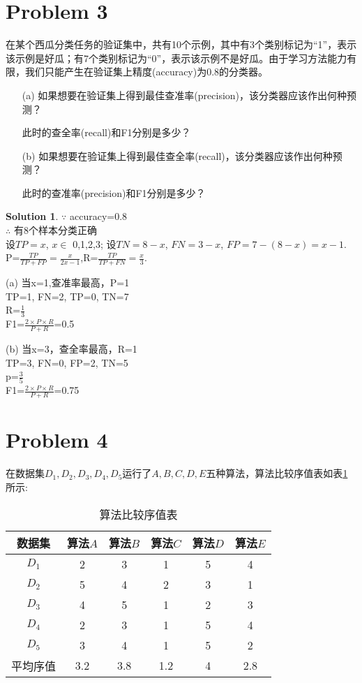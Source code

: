 \documentclass[a4paper,UTF8]{article}
\theoremstyle{definition}
\newtheorem*{solution}{Solution}
\begin{document}
\section*{Problem 3} 
在某个西瓜分类任务的验证集中，共有10个示例，其中有3个类别标记为“1”，表示该示例是好瓜；有7个类别标记为“0”，表示该示例不是好瓜。由于学习方法能力有限，我们只能产生在验证集上精度(accuracy)为0.8的分类器。
\begin{itemize}
\item[(a)] 如果想要在验证集上得到最佳查准率(precision)，该分类器应该作出何种预测？

此时的查全率(recall)和F1分别是多少？
\item[(b)] 如果想要在验证集上得到最佳查全率(recall)，该分类器应该作出何种预测？

此时的查准率(precision)和F1分别是多少？
\end{itemize}
\begin{solution}
$\because$ accuracy=0.8\\
$\therefore$ 有8个样本分类正确\\
设$TP=x$, $x\in$ {0,1,2,3}; 设$TN=8-x$, $FN=3-x$, $FP=7-(8-x)=x-1$.\\
P=$\frac{TP}{TP+FP}=\frac{x}{2x-1}$,R=$\frac{TP}{TP+FN}=\frac{x}{3}$.
\item[(a)]当x=1,查准率最高，P=1\\
TP=1, FN=2, TP=0, TN=7\\
R=$\frac{1}{3}$\\
F1=$\frac{2\times P\times R}{P+R}$=0.5

\item[(b)]当x=3，查全率最高，R=1\\
TP=3, FN=0, FP=2, TN=5\\
p=$\frac{3}{5}$\\
F1=$\frac{2\times P\times R}{P+R}$=0.75
\end{solution}

\section*{Problem 4} 
在数据集$D_1,D_2,D_3,D_4,D_5$运行了$A,B,C,D,E$五种算法，算法比较序值表如表\ref{table:ranking}所示:
\begin{table}[h]
\centering
\caption{算法比较序值表} \vspace{2mm}\label{table:ranking}
\begin{tabular}{c|c c c c c}\hline
数据集 & 算法$A$ & 算法$B$  & 算法$C$  &算法$D$  &算法$E$ \\
\hline
$D_1$ & 2  & 3 &  1 &  5  & 4\\
$D_2$ & 5  & 4 &  2 &  3  & 1\\
$D_3$ & 4  & 5 &  1 &  2  & 3\\
$D_4$ & 2  & 3 &  1 &  5  & 4\\
$D_5$ & 3  & 4 &  1 &  5  & 2\\
\hline
平均序值 & 3.2 &  3.8 & 1.2 &  4 &  2.8 \\
\hline
\end{tabular}
\end{table}
\end{document}
